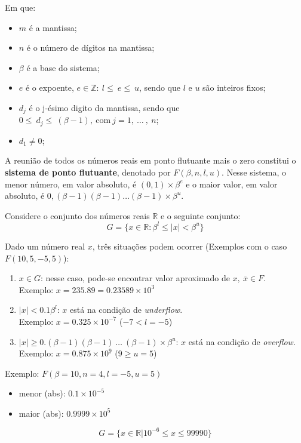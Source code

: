 \documentclass{article}
\begin{document}
        Em que:
        \begin{itemize}
            \item $m$ é a mantissa;
            \item $n$ é o número de dígitos na mantissa;
            \item $\beta$ é a base do sistema;
            \item $e$ é o expoente, $e \in \mathbb{Z}:~l\leq~e\leq~u$, sendo que $l$ e $u$ são inteiros fixos;
            \item $d_j$ é o j-ésimo digito da mantissa, sendo que $0\leq~d_j\leq~(\beta - 1),~\textrm{com}~j = 1,~\ldots~,~n$;
            \item $d_1 \neq 0$;
        \end{itemize}

        A reunião de todos os números reais em ponto flutuante mais o zero constitui o \textbf{sistema de ponto flutuante}, denotado por $F(\beta, n, l, u)$. Nesse sistema, o menor número, em valor absoluto, é $(0,1)\times\beta^e$ e o maior valor, em valor absoluto, é $0,(\beta-1)(\beta-1)\ldots(\beta-1)\times\beta^u$. %

        Considere o conjunto dos números reais $\mathbb{R}$ e o seguinte conjunto:
        \[G = \{x \in \mathbb{R} : {\beta}^l \leq |x| < {\beta}^u\}\]

        Dado um número real $x$, três situações podem ocorrer (Exemplos com o caso $F(10, 5, -5, 5)$):

        \begin{enumerate}
                \item $x \in G$: nesse caso, pode-se encontrar valor aproximado de $x,~\overline{x} \in F$.\\
                    Exemplo: $x = 235.89 = 0.23589 \times 10^3$
                \item $|x| < 0.1\beta^l$: $x$ está na condição de \textit{underflow}.\\
                    Exemplo: $x = 0.325 \times 10^{-7}$ ($-7 < l = -5$)
                \item $|x| \ge 0.(\beta-1)(\beta-1)~\ldots~(\beta-1) \times \beta^u$: $x$ está na condição de \textit{overflow}.\\
                    Exemplo: $x = 0.875 \times 10^{\underline{9}}$ ($9 \ge u = 5$)
        \end{enumerate}

        Exemplo: $F(\beta = 10, n = 4, l = -5, u = 5)$
        \begin{itemize}
                \item menor (abs): $0.1 \times 10^{-5}$
                \item maior (abs): $0.9999 \times 10^{5}$
        \end{itemize}
        \[G = \{x \in \mathbb{R} | 10^{-6} \leq x \leq 99990\}\]
\end{document}
